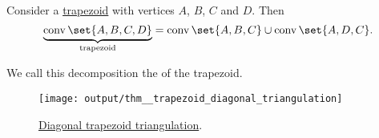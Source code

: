 \begin{proposition}\label{thm:diagonal_trapezoid_triangulation}
  Consider a \hyperref[def:trapezoid]{trapezoid} with vertices \( A \), \( B \), \( C \) and \( D \). Then
  \begin{equation*}
    \underbrace{\conv\set{ A, B, C, D }}_{\T{trapezoid}} = \conv\set{ A, B, C } \cup \conv\set{ A, D, C }.
  \end{equation*}

  We call this decomposition the  of the trapezoid.

  \begin{figure}[!ht]
    \centering
    \texttt{[image: output/thm\_\_trapezoid\_diagonal\_triangulation]}
    \caption{\hyperref[thm:diagonal_trapezoid_triangulation]{Diagonal trapezoid triangulation}.}\label{fig:thm:diagonal_trapezoid_triangulation}
  \end{figure}
\end{proposition}
